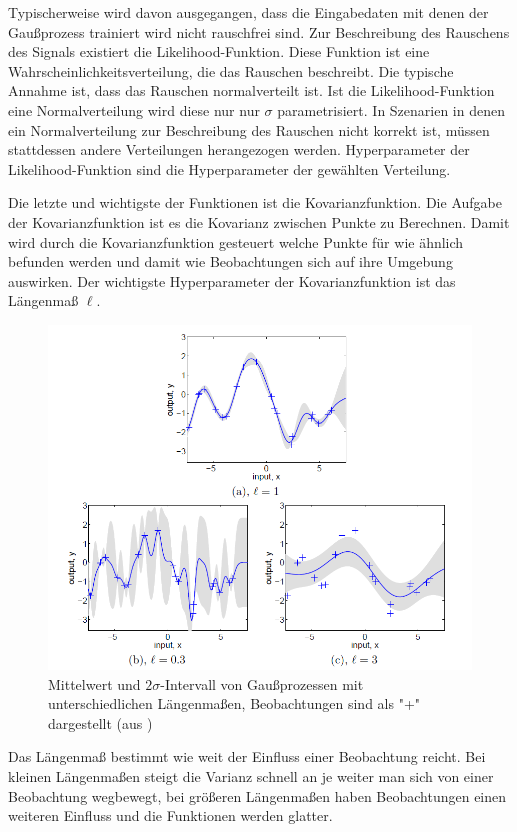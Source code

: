 Typischerweise wird davon ausgegangen, dass die Eingabedaten mit denen der Gaußprozess trainiert wird nicht rauschfrei sind.
Zur Beschreibung des Rauschens des Signals existiert die Likelihood-Funktion.
Diese Funktion ist eine Wahrscheinlichkeitsverteilung, die das Rauschen beschreibt.
Die typische Annahme ist, dass das Rauschen normalverteilt ist.
Ist die Likelihood-Funktion eine Normalverteilung wird diese nur nur $\sigma$ parametrisiert.
In Szenarien in denen ein Normalverteilung zur Beschreibung des Rauschen nicht korrekt ist, müssen stattdessen andere Verteilungen herangezogen werden.
Hyperparameter der Likelihood-Funktion sind die Hyperparameter der gewählten Verteilung.

Die letzte und wichtigste der Funktionen ist die Kovarianzfunktion.
Die Aufgabe der Kovarianzfunktion ist es die Kovarianz zwischen Punkte zu Berechnen.
Damit wird durch die Kovarianzfunktion gesteuert welche Punkte für wie ähnlich befunden werden und damit wie Beobachtungen sich auf ihre Umgebung auswirken.
Der wichtigste Hyperparameter der Kovarianzfunktion ist das Längenmaß $\ell$.
\begin{figure}[h]
	\centering
	\includegraphics[width=1\linewidth]{bilder/lengthscale}
	\caption{Mittelwert und $2\sigma$-Intervall von Gaußprozessen mit unterschiedlichen Längenmaßen, Beobachtungen sind als "+" dargestellt (aus \cite{Rasmussen.2008})}
	\label{fig:lengthscale}
\end{figure}
Das Längenmaß bestimmt wie weit der Einfluss einer Beobachtung reicht.
Bei kleinen Längenmaßen steigt die Varianz schnell an je weiter man sich von einer Beobachtung wegbewegt, bei größeren Längenmaßen haben Beobachtungen einen weiteren Einfluss und die Funktionen werden glatter.
